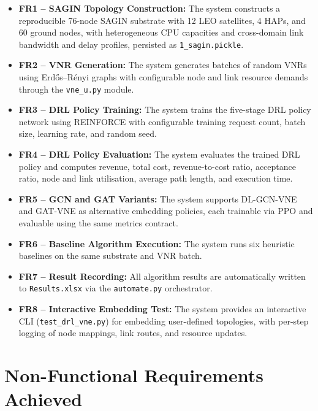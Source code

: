 \documentclass[12pt,a4paper]{report}
\begin{document}
\begin{itemize}[leftmargin=*]
  \item \textbf{FR1 -- SAGIN Topology Construction:} The system constructs a reproducible
        76-node SAGIN substrate with 12 LEO satellites, 4 HAPs, and 60 ground nodes, with
        heterogeneous CPU capacities and cross-domain link bandwidth and delay profiles,
        persisted as \texttt{1\_sagin.pickle}.

  \item \textbf{FR2 -- VNR Generation:} The system generates batches of random VNRs using
        Erdős--Rényi graphs with configurable node and link resource demands through the
        \texttt{vne\_u.py} module.

  \item \textbf{FR3 -- DRL Policy Training:} The system trains the five-stage DRL policy
        network using REINFORCE with configurable training request count, batch size, learning
        rate, and random seed.

  \item \textbf{FR4 -- DRL Policy Evaluation:} The system evaluates the trained DRL policy
        and computes revenue, total cost, revenue-to-cost ratio, acceptance ratio, node and
        link utilisation, average path length, and execution time.

  \item \textbf{FR5 -- GCN and GAT Variants:} The system supports DL-GCN-VNE and GAT-VNE as
        alternative embedding policies, each trainable via PPO and evaluable using the same
        metrics contract.

  \item \textbf{FR6 -- Baseline Algorithm Execution:} The system runs six heuristic baselines
        on the same substrate and VNR batch.

  \item \textbf{FR7 -- Result Recording:} All algorithm results are automatically written to
        \texttt{Results.xlsx} via the \texttt{automate.py} orchestrator.

  \item \textbf{FR8 -- Interactive Embedding Test:} The system provides an interactive CLI
        (\texttt{test\_drl\_vne.py}) for embedding user-defined topologies, with per-step
        logging of node mappings, link routes, and resource updates.
\end{itemize}

\section{Non-Functional Requirements Achieved}
\end{document}
